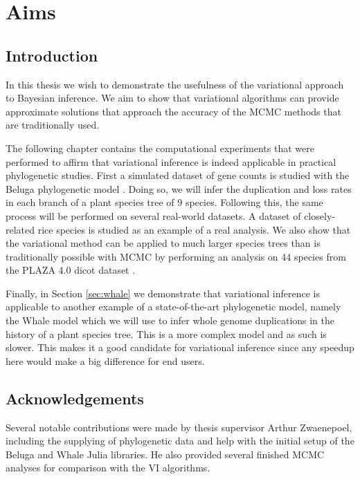 
\chapter{Aims}

\section{Introduction}
In this thesis we wish to demonstrate the usefulness of the variational approach to Bayesian inference. We aim to show that variational algorithms can provide approximate solutions that approach the accuracy of the MCMC methods that are traditionally used.
\medskip 
\par The following chapter contains the computational experiments that were performed to affirm that variational inference is indeed applicable in practical phylogenetic studies. First a simulated dataset of gene counts is studied with the Beluga phylogenetic model \parencite{beluga}. Doing so, we will infer the duplication and loss rates in each branch of a plant species tree of 9 species. Following this, the same process will be performed on several real-world datasets. A dataset of closely-related rice species is studied as an example of a real analysis. We also show that the variational method can be applied to much larger species trees than is traditionally possible with MCMC by performing an analysis on 44 species from the PLAZA 4.0 dicot dataset \parencite{PLAZA-paper-1}.
\medskip
\par Finally, in Section \ref{sec:whale} we demonstrate that variational inference is applicable to another example of a state-of-the-art phylogenetic model, namely the Whale model \parencite{whale} which we will use to infer whole genome duplications in the history of a plant species tree. This is a more complex model and as such is slower. This makes it a good candidate for variational inference since any speedup here would make a big difference for end users.

\section{Acknowledgements}
Several notable contributions were made by thesis supervisor Arthur Zwaenepoel, including the supplying of phylogenetic data and help with the initial setup of the Beluga and Whale Julia libraries. He also provided several finished MCMC analyses for comparison with the VI algorithms.


